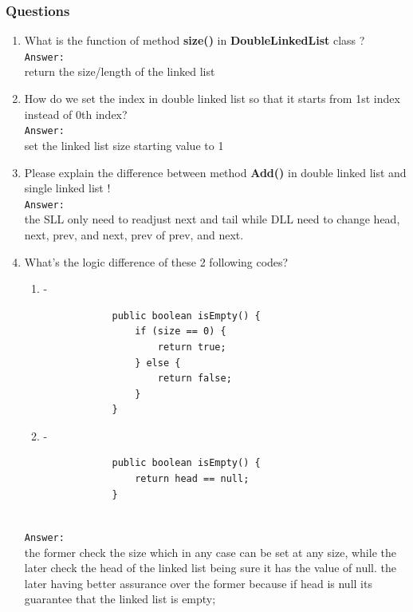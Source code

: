 \documentclass[12pt,titlepage]{article}
\begin{document}
\subsubsection{Questions}
\begin{enumerate}
    \item What is the function of method \textbf{size()} in \textbf{DoubleLinkedList} class ?
    \mbox{}\\
    \texttt{Answer: }
    \mbox{}\\
    return the size/length of the linked list
    \item How do we set the index in double linked list so that it starts from 1st index instead of 0th index?
    \mbox{}\\
    \texttt{Answer: }
    \mbox{}\\
    set the linked list size starting value to 1
    \item Please explain the difference between method \textbf{Add()} in double linked list and single linked list !
    \mbox{}\\
    \texttt{Answer: }
    \mbox{}\\
    the SLL only need to readjust next and tail while DLL need to change head, next, prev, and next, prev of prev, and next.  
    \item What’s the logic difference of these 2 following codes?
    \begin{enumerate}[label=(\alph*)]
        \item -
        \begin{verbatim}
            public boolean isEmpty() {
                if (size == 0) {
                    return true;
                } else {
                    return false;
                }
            }
        \end{verbatim}
        \item -
        \begin{verbatim}
            public boolean isEmpty() {
                return head == null;
            }
        \end{verbatim}
    \end{enumerate}
    \mbox{}\\
    \texttt{Answer: }
    \mbox{}\\
    the former check the size which in any case can be set at any size, while the later check the head of the linked list being sure it has the value of null. the later having better assurance over the former because if head is null its guarantee that the linked list is empty;
\end{enumerate}
\end{document}
